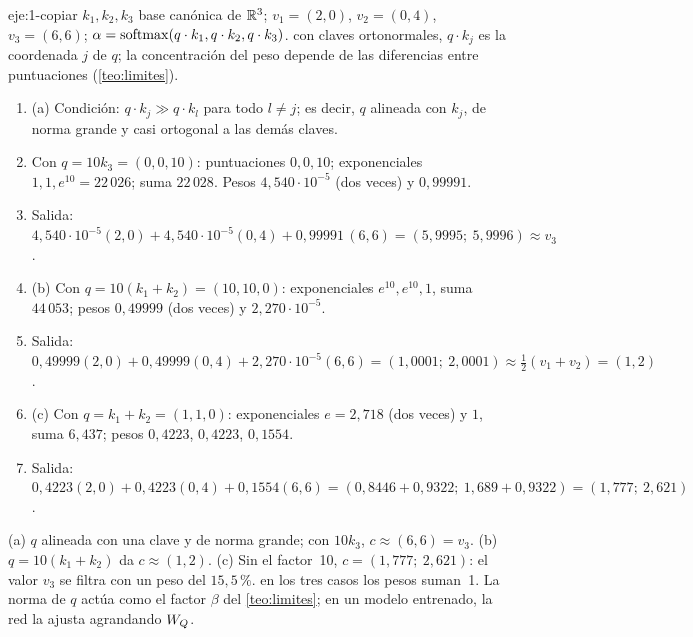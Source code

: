 \begin{solucion}{eje:1-copiar}
\datos $k_1,k_2,k_3$ base canónica de $\mathbb{R}^{3}$; $v_1=(2,0)$, $v_2=(0,4)$, $v_3=(6,6)$; $\alpha=\operatorname{softmax}(q\cdot k_1,q\cdot k_2,q\cdot k_3)$.
\planteamiento con claves ortonormales, $q\cdot k_j$ es la coordenada $j$ de $q$; la concentración del peso depende de las diferencias entre puntuaciones (\cref{teo:limites}).
\pasos
\begin{enumerate}[label=\arabic*.]
  \item (a) Condición: $q\cdot k_j\gg q\cdot k_l$ para todo $l\ne j$; es decir, $q$ alineada con $k_j$, de norma grande y casi ortogonal a las demás claves.
  \item Con $q=10k_3=(0,0,10)$: puntuaciones $0,0,10$; exponenciales $1,1,e^{10}=22\,026$; suma $22\,028$. Pesos $4{,}540\cdot 10^{-5}$ (dos veces) y $0{,}99991$.
  \item Salida: $4{,}540\cdot10^{-5}(2,0)+4{,}540\cdot10^{-5}(0,4)+0{,}99991\,(6,6)=(5{,}9995;\allowbreak\ 5{,}9996)\approx v_3$.
  \item (b) Con $q=10(k_1+k_2)=(10,10,0)$: exponenciales $e^{10},e^{10},1$, suma $44\,053$; pesos $0{,}49999$ (dos veces) y $2{,}270\cdot10^{-5}$.
  \item Salida: $0{,}49999(2,0)+0{,}49999(0,4)+2{,}270\cdot10^{-5}(6,6)=(1{,}0001;\allowbreak\ 2{,}0001)\approx\tfrac12(v_1+v_2)=(1,2)$.
  \item (c) Con $q=k_1+k_2=(1,1,0)$: exponenciales $e=2{,}718$ (dos veces) y $1$, suma $6{,}437$; pesos $0{,}4223$, $0{,}4223$, $0{,}1554$.
  \item Salida: $0{,}4223(2,0)+0{,}4223(0,4)+0{,}1554(6,6)=(0{,}8446+0{,}9322;\allowbreak\ 1{,}689+0{,}9322)=(1{,}777;\allowbreak\ 2{,}621)$.
\end{enumerate}
\resultado (a) $q$ alineada con una clave y de norma grande; con $10k_3$, \textbf{$c\approx(6,6)=v_3$}. (b) $q=10(k_1+k_2)$ da \textbf{$c\approx(1,2)$}. (c) Sin el factor~10, \textbf{$c=(1{,}777;\allowbreak\ 2{,}621)$}: el valor $v_3$ se filtra con un peso del $15{,}5\,\%$.
\comprobacion en los tres casos los pesos suman~1. La norma de $q$ actúa como el factor $\beta$ del \cref{teo:limites}; en un modelo entrenado, la red la ajusta agrandando $W_{Q}$.
\end{solucion}


